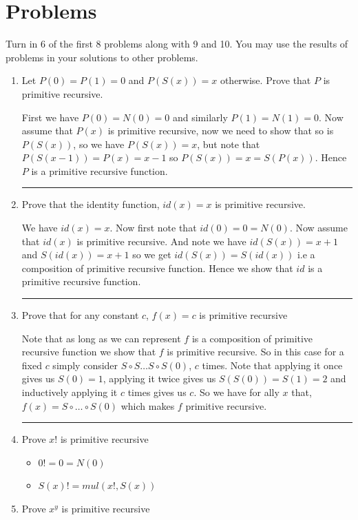 \documentclass[11pt]{article}
\newenvironment{proof}{{\bf Proof:}}{\hfill\rule{2mm}{2mm}}
\begin{document}
\section{Problems}
Turn in 6 of the first 8 problems along with 9 and 10.  You may use the results of problems in your solutions to other problems.
\begin{enumerate}
    \item Let $P(0) = P(1) = 0$ and $P(S(x)) = x$ otherwise. Prove that $P$ is primitive recursive.

      \begin{proof}
        First we have $P(0) = N(0) = 0$ and similarly $P(1) = N(1) = 0$. Now assume that $P(x)$ is primitive recursive, now we need to show that so is $P(S(x))$, so we have $P(S(x)) = x$, but note that $P(S(x - 1)) = P(x) = x - 1$ so $P(S(x)) = x = S(P(x))$. Hence $P$ is a primitive recursive function.
      \end{proof}

    \item Prove that the identity function, $id(x) = x$ is primitive recursive.

      \begin{proof}
        We have $id(x) = x$. Now first note that $id(0) = 0 = N(0)$. Now assume that $id(x)$ is primitive recursive. And note we have $id(S(x)) = x + 1$ and $S(id(x)) = x + 1$ so we get $id(S(x)) = S(id(x))$ i.e a composition of primitive recursive function. Hence we show that $id$ is a primitive recursive function.
      \end{proof}
    \item Prove that for any constant $c$, $f(x) = c$ is primitive recursive
    
      \begin{proof}
        Note that as long as we can represent $f$ is a composition of primitive recursive function we show that $f$ is primitive recursive. So in this case for a fixed $c$ simply consider $S \circ S \dots S \circ S(0)$, $c$ times. Note that applying it once gives us $S(0) = 1$, applying it twice gives us $S(S(0)) = S(1) = 2$ and inductively applying it $c$ times gives us $c$. So we have for ally $x$ that, $f(x) = S \circ \dots \circ S(0)$ which makes $f$ primitive recursive.
      \end{proof}
    \item Prove $x!$ is primitive recursive
    
    \begin{itemize}
        \item $0! = 0 = N(0)$ 
        \item $S(x)! = mul(x!, S(x))$ 
    \end{itemize}
    \item Prove $x^y$ is primitive recursive


\end{enumerate}
\end{document}
